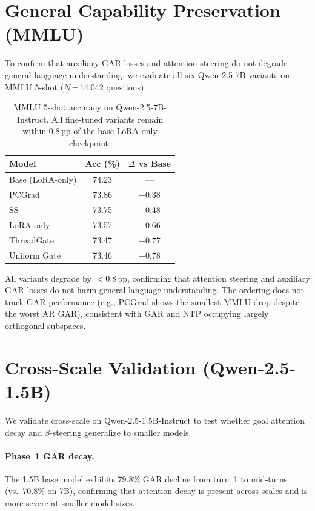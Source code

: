 \section{General Capability Preservation (MMLU)}\label{sec:appendix-mmlu}

To confirm that auxiliary GAR losses and attention steering do not degrade general language understanding, we evaluate all six Qwen-2.5-7B variants on MMLU 5-shot \citep{hendrycks2021measuring} ($N$\,=\,14{,}042 questions).

\begin{table}[t]
\centering\small
\caption{MMLU 5-shot accuracy on Qwen-2.5-7B-Instruct. All fine-tuned variants remain within 0.8\,pp of the base LoRA-only checkpoint.}
\label{tab:mmlu}
\begin{tabular}{lcc}
\toprule
\textbf{Model} & \textbf{Acc (\%)} & \textbf{$\Delta$ vs Base} \\
\midrule
Base (LoRA-only) & 74.23 & --- \\
PCGrad & 73.86 & $-$0.38 \\
SS & 73.75 & $-$0.48 \\
LoRA-only & 73.57 & $-$0.66 \\
ThreadGate & 73.47 & $-$0.77 \\
Uniform Gate & 73.46 & $-$0.78 \\
\bottomrule
\end{tabular}
\end{table}

All variants degrade by $<$0.8\,pp, confirming that attention steering and auxiliary GAR losses do not harm general language understanding. The ordering does not track GAR performance (e.g., PCGrad shows the smallest MMLU drop despite the worst AR GAR), consistent with GAR and NTP occupying largely orthogonal subspaces.

\section{Cross-Scale Validation (Qwen-2.5-1.5B)}\label{sec:appendix-1.5b}

We validate cross-scale on Qwen-2.5-1.5B-Instruct to test whether goal attention decay and $\beta$-steering generalize to smaller models.

\paragraph{Phase~1 GAR decay.} The 1.5B base model exhibits 79.8\% GAR decline from turn~1 to mid-turns (vs.\ 70.8\% on 7B), confirming that attention decay is present across scales and is more severe at smaller model sizes.

